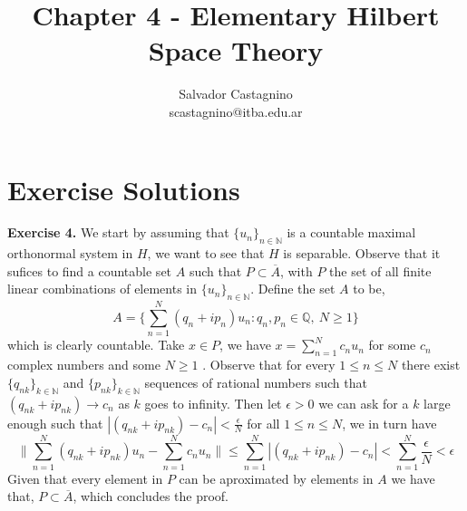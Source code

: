 \documentclass{article}
\author{Salvador Castagnino \\ scastagnino@itba.edu.ar}
\date{}
\title{Chapter 4 - Elementary Hilbert Space Theory}
\begin{document}
\maketitle

\section*{Exercise Solutions}

\begin{exercise}\textbf{Exercise 4.}
    We start by assuming that $\{u_n\}_{n \in \mathbb{N}}$ is a countable maximal orthonormal system in $H$, we want to see that $H$ is separable. Observe that it sufices to find a countable set $A$ such that $P \subset \overline{A}$, with $P$ the set of all finite linear combinations of elements in $\{u_n\}_{n \in \mathbb{N}}$. Define the set $A$ to be,
    \[
        A = \Bigg\{ \sum_{n=1}^{N} \left( q_n + i p_n \right)  u_n : q_n,p_n \in \mathbb{Q},\ N \ge 1\Bigg\} 
    \]
    which is clearly countable. Take $x \in P$, we have $x = \sum_{n=1}^{N} c_n u_n $ for some $c_n$ complex numbers and some $N \ge 1$ . Observe that for every $1 \le n \le N$ there exist $\{q_{nk}\}_{k \in \mathbb{N}}$ and $\{p_{nk}\}_{k \in \mathbb{N}}$ sequences of rational numbers such that $ \left( q_{nk} + i p_{nk} \right) \rightarrow c_n$ as $k$ goes to infinity. Then let $\epsilon > 0$ we can ask for a $k$ large enough such that $|\left( q_{nk} + i p_{nk} \right) - c_n| < \frac{\epsilon}{N}$ for all $1 \le n \le N$, we in turn have
    \[
        \|\sum_{n=1}^{N} \left( q_{nk} + i p_{nk} \right)u_n - \sum_{n=1}^{N} c_n u_n \| \le \sum_{n=1}^{N} |\left( q_{nk} + i p_{nk} \right) - c_n| < \sum_{n=1}^{N} \frac{\epsilon}{N} < \epsilon 
    \]
    Given that every element in $P$ can be aproximated by elements in $A$ we have that, $P \subset \overline{A}$, which concludes the proof.

\bigbreak


\end{exercise}
\end{document}
